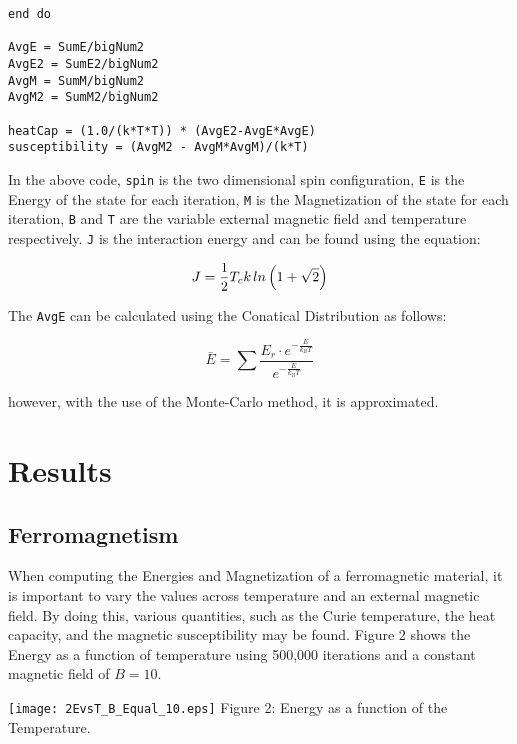 \documentclass{article}
\begin{document}
\begin{multicols}{2}
\begin{verbatim}
end do

AvgE = SumE/bigNum2
AvgE2 = SumE2/bigNum2
AvgM = SumM/bigNum2
AvgM2 = SumM2/bigNum2

heatCap = (1.0/(k*T*T)) * (AvgE2-AvgE*AvgE)
susceptibility = (AvgM2 - AvgM*AvgM)/(k*T)

\end{verbatim}

In the above code, \verb!spin! is the two dimensional spin configuration, \verb!E! is the Energy of the state for each iteration, \verb!M! is the Magnetization of the state for each iteration, \verb!B! and \verb!T! are the variable external magnetic field and temperature respectively. \verb!J! is the interaction energy and can be found using the equation:

\begin{equation}
    \label{equation1}
    		J = \frac{1}{2} T_c k \hspace{0.02in} ln\left(1 + \sqrt{2}\right)
\end{equation}

\vspace{0.1in}

The \verb!AvgE! can be calculated using the Conatical Distribution as follows:

\begin{equation}
    \label{equation2}
    \bar{E} = \sum \frac{E_r \cdot e^{-\frac{E}{k_BT}}}{e^{-\frac{E}{k_BT}}}
\end{equation}

\vspace{0.1in}

however, with the use of the Monte-Carlo method, it is approximated. 

\section{Results}
\subsection{Ferromagnetism}
When computing the Energies and Magnetization of a ferromagnetic material, it is important to vary the values across temperature and an external magnetic field. By doing this, various quantities, such as the Curie temperature, the heat capacity, and the magnetic susceptibility may be found. Figure 2 shows the Energy as a function of temperature using 500,000 iterations and a constant magnetic field of $B=10$.

\begin{center}
\texttt{[image: 2EvsT\_B\_Equal\_10.eps]}
\scriptsize{
Figure 2: Energy as a function of the Temperature.
}
\end{center}


\end{multicols}
\end{document}

